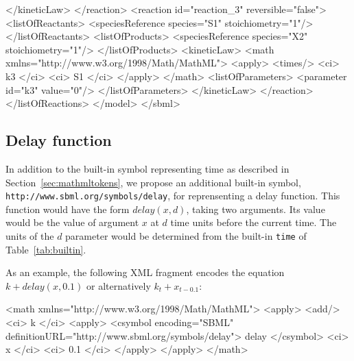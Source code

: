 \documentclass[10pt,twocolumntoc]{cekarticle}
\newcommand{\vref}[1]{\ref{#1}}
\begin{document}
\begin{example}
                </kineticLaw>
            </reaction>
            <reaction id="reaction_3" reversible="false">
                <listOfReactants>
                    <speciesReference species="S1" stoichiometry="1"/>
                </listOfReactants>
                <listOfProducts>
                    <speciesReference species="X2" stoichiometry="1"/>
                </listOfProducts>
                <kineticLaw>
                    <math xmlns="http://www.w3.org/1998/Math/MathML">
                        <apply>
                            <times/>
                            <ci> k3 </ci>
                            <ci> S1 </ci>
                        </apply>
                    </math>
                    <listOfParameters>
                        <parameter id="k3" value="0"/>
                    </listOfParameters>
                </kineticLaw>
            </reaction>
        </listOfReactions>
    </model>
</sbml>
\end{example}

\subsection{Delay function}
\label{sec:delay}

In addition to the built-in symbol representing time as described in
Section~\ref{sec:mathmltokens}, we propose an additional built-in symbol,
\texttt{http://www.sbml.org/symbols/delay}, for reprensenting a delay
function.  This function would have the form $delay(x, d)$, taking two
arguments.  Its value would be the value of argument $x$ at $d$ time units
before the current time.  The units of the $d$ parameter would be
determined from the built-in \texttt{time} of Table~\vref{tab:builtin}.

As an example, the following XML fragment encodes the equation $k +
delay(x, 0.1)$ or alternatively $k_t + x_{t - 0.1}$:
\begin{example}
<math xmlns="http://www.w3.org/1998/Math/MathML">
    <apply>
        <add/>
        <ci> k </ci>
        <apply>
            <csymbol encoding="SBML" definitionURL="http://www.sbml.org/symbols/delay">
                delay
            </csymbol>
            <ci> x </ci>
            <ci> 0.1 </ci>
        </apply>
    </apply>
</math>
\end{example}

\end{document}
